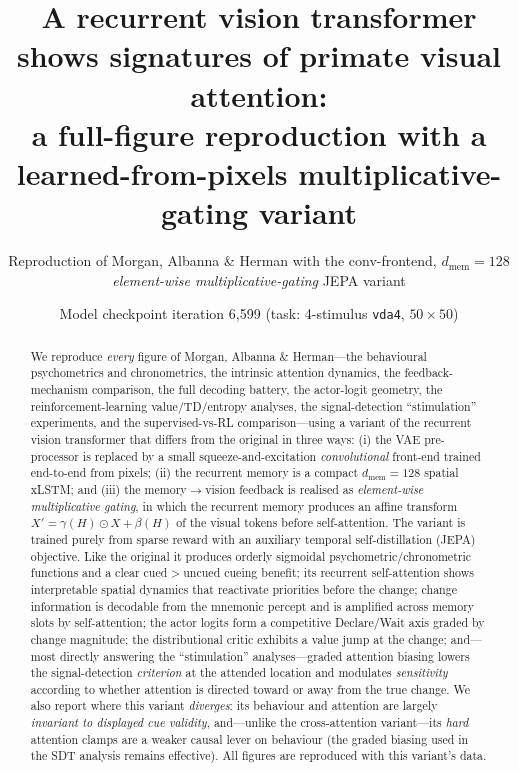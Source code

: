 \documentclass[11pt]{article}
\title{\textbf{A recurrent vision transformer shows signatures of primate visual attention:\\
a full-figure reproduction with a learned-from-pixels multiplicative-gating variant}}
\author{Reproduction of Morgan, Albanna \& Herman with the conv-frontend, $d_{\mathrm{mem}}{=}128$ \emph{element-wise multiplicative-gating} JEPA variant}
\date{Model checkpoint iteration 6{,}599 (task: 4-stimulus \texttt{vda4}, $50\times50$)}
\begin{document}
\maketitle
\begin{abstract}\noindent
We reproduce \emph{every} figure of Morgan, Albanna \& Herman---the behavioural psychometrics and
chronometrics, the intrinsic attention dynamics, the feedback-mechanism comparison, the full decoding
battery, the actor-logit geometry, the reinforcement-learning value/TD/entropy analyses, the
signal-detection ``stimulation'' experiments, and the supervised-vs-RL comparison---using a variant of
the recurrent vision transformer that differs from the original in three ways: (i) the VAE
pre-processor is replaced by a small squeeze-and-excitation \emph{convolutional} front-end trained
end-to-end from pixels; (ii) the recurrent memory is a compact $d_{\mathrm{mem}}{=}128$ spatial xLSTM;
and (iii) the memory$\to$vision feedback is realised as \emph{element-wise multiplicative gating}, in
which the recurrent memory produces an affine transform $X'{=}\gamma(H)\odot X+\beta(H)$ of the visual
tokens before self-attention. The variant is trained purely from sparse reward with an auxiliary
temporal self-distillation (JEPA) objective. Like the original it produces orderly sigmoidal
psychometric/chronometric functions and a clear cued$>$uncued cueing benefit; its recurrent
self-attention shows interpretable spatial dynamics that reactivate priorities before the change; change
information is decodable from the mnemonic percept and is amplified across memory slots by
self-attention; the actor logits form a competitive Declare/Wait axis graded by change magnitude; the
distributional critic exhibits a value jump at the change; and---most directly answering the
``stimulation'' analyses---graded attention biasing lowers the signal-detection \emph{criterion} at the
attended location and modulates \emph{sensitivity} according to whether attention is directed toward or
away from the true change. We also report where this variant \emph{diverges}: its behaviour and
attention are largely \emph{invariant to displayed cue validity}, and---unlike the cross-attention
variant---its \emph{hard} attention clamps are a weaker causal lever on behaviour (the graded biasing
used in the SDT analysis remains effective). All figures are reproduced with this variant's data.
\end{abstract}
\end{document}
